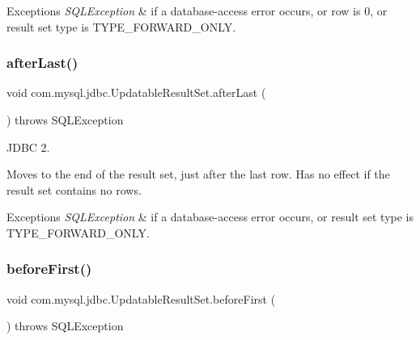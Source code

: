 \begin{DoxyExceptions}{Exceptions}
{\em S\+Q\+L\+Exception} & if a database-\/access error occurs, or row is 0, or result set type is T\+Y\+P\+E\+\_\+\+F\+O\+R\+W\+A\+R\+D\+\_\+\+O\+N\+LY. \\
\hline
\end{DoxyExceptions}
\mbox{\label{classcom_1_1mysql_1_1jdbc_1_1_updatable_result_set_aff9351c1dacdf8d0a381f3266aca18ac}} 
\subsubsection{\texorpdfstring{after\+Last()}{afterLast()}}
{\footnotesize\ttfamily void com.\+mysql.\+jdbc.\+Updatable\+Result\+Set.\+after\+Last (\begin{DoxyParamCaption}{ }\end{DoxyParamCaption}) throws S\+Q\+L\+Exception}

J\+D\+BC 2.

Moves to the end of the result set, just after the last row. Has no effect if the result set contains no rows. 


\begin{DoxyExceptions}{Exceptions}
{\em S\+Q\+L\+Exception} & if a database-\/access error occurs, or result set type is T\+Y\+P\+E\+\_\+\+F\+O\+R\+W\+A\+R\+D\+\_\+\+O\+N\+LY. \\
\hline
\end{DoxyExceptions}
\mbox{\label{classcom_1_1mysql_1_1jdbc_1_1_updatable_result_set_a517136f9be65445c0d45a3a4bd020955}} 
\subsubsection{\texorpdfstring{before\+First()}{beforeFirst()}}
{\footnotesize\ttfamily void com.\+mysql.\+jdbc.\+Updatable\+Result\+Set.\+before\+First (\begin{DoxyParamCaption}{ }\end{DoxyParamCaption}) throws S\+Q\+L\+Exception}

